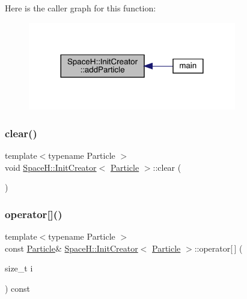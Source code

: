 Here is the caller graph for this function\+:
\nopagebreak
\begin{figure}[H]
\begin{center}
\leavevmode
\includegraphics[width=257pt]{class_space_h_1_1_init_creator_a3d0b62c72c0bd432ca93ec3ec60f6153_icgraph}
\end{center}
\end{figure}
\mbox{\label{class_space_h_1_1_init_creator_aa54d6696d3cd8cab4db3a284aaeb54ca}} 
\subsubsection{\texorpdfstring{clear()}{clear()}}
{\footnotesize\ttfamily template$<$typename Particle $>$ \\
void \mbox{\hyperlink{class_space_h_1_1_init_creator}{Space\+H\+::\+Init\+Creator}}$<$ \mbox{\hyperlink{struct_space_h_1_1_particle}{Particle}} $>$\+::clear (\begin{DoxyParamCaption}{ }\end{DoxyParamCaption})\hspace{0.3cm}{\ttfamily [inline]}}

\mbox{\label{class_space_h_1_1_init_creator_a3de1c9fb8bfd533fe69aa782d8d1bcb8}} 
\subsubsection{\texorpdfstring{operator[]()}{operator[]()}}
{\footnotesize\ttfamily template$<$typename Particle $>$ \\
const \mbox{\hyperlink{struct_space_h_1_1_particle}{Particle}}\& \mbox{\hyperlink{class_space_h_1_1_init_creator}{Space\+H\+::\+Init\+Creator}}$<$ \mbox{\hyperlink{struct_space_h_1_1_particle}{Particle}} $>$\+::operator\mbox{[}$\,$\mbox{]} (\begin{DoxyParamCaption}\item[{size\+\_\+t}]{i }\end{DoxyParamCaption}) const\hspace{0.3cm}{\ttfamily [inline]}}

